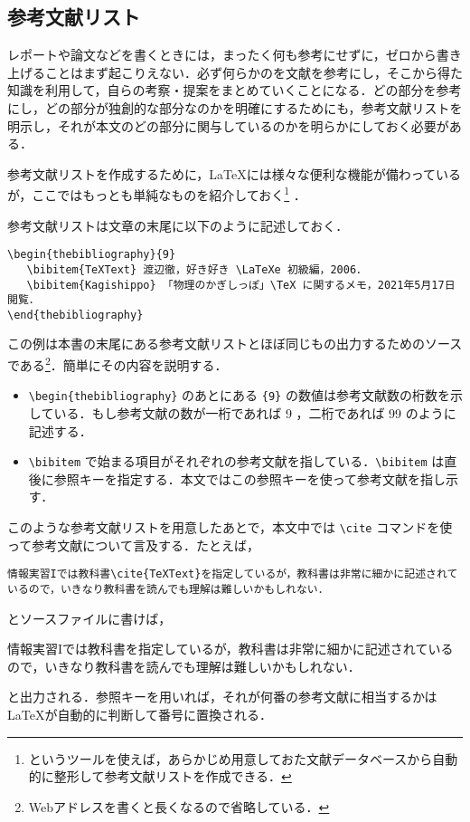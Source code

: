 \subsection{参考文献リスト}

レポートや論文などを書くときには，まったく何も参考にせずに，ゼロから書き上げることはまず起こりえない．必ず何らかのを文献を参考にし，そこから得た知識を利用して，自らの考察・提案をまとめていくことになる．どの部分を参考にし，どの部分が独創的な部分なのかを明確にするためにも，参考文献リストを明示し，それが本文のどの部分に関与しているのかを明らかにしておく必要がある．

参考文献リストを作成するために，\LaTeX には様々な便利な機能が備わっているが，ここではもっとも単純なものを紹介しておく\footnote{\BibTeX というツールを使えば，あらかじめ用意しておた文献データベースから自動的に整形して参考文献リストを作成できる．} ．

参考文献リストは文章の末尾に以下のように記述しておく．
\begin{screen}
\begin{verbatim}
\begin{thebibliography}{9}
   \bibitem{TeXText} 渡辺徹，好き好き \LaTeXe 初級編，2006．
   \bibitem{Kagishippo} 「物理のかぎしっぽ」\TeX に関するメモ，2021年5月17日閲覧．
\end{thebibliography}
\end{verbatim}
\end{screen}
この例は本書の末尾にある参考文献リストとほぼ同じもの出力するためのソースである\footnote{Webアドレスを書くと長くなるので省略している．}．簡単にその内容を説明する．
\begin{itemize}
\item \verb|\begin{thebibliography}| のあとにある \verb|{9}| の数値は参考文献数の桁数を示している．もし参考文献の数が一桁であれば 9 ，二桁であれば 99 のように記述する．
\item \verb|\bibitem| で始まる項目がそれぞれの参考文献を指している．\verb|\bibitem| は直後に参照キーを指定する．本文ではこの参照キーを使って参考文献を指し示す．
\end{itemize}
このような参考文献リストを用意したあとで，本文中では \verb|\cite| コマンドを使って参考文献について言及する．たとえば，
\begin{screen}
\begin{verbatim}
情報実習Iでは教科書\cite{TeXText}を指定しているが，教科書は非常に細かに記述されているので，いきなり教科書を読んでも理解は難しいかもしれない．
\end{verbatim}
\end{screen}
とソースファイルに書けば，
\begin{screen}
情報実習Iでは教科書\cite{TeXText}を指定しているが，教科書は非常に細かに記述されているので，いきなり教科書を読んでも理解は難しいかもしれない．
\end{screen}
と出力される．参照キーを用いれば，それが何番の参考文献に相当するかは \LaTeX が自動的に判断して番号に置換される．

